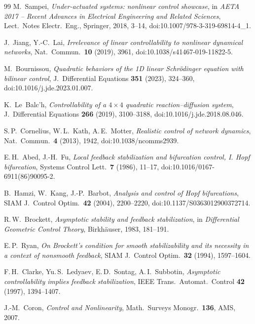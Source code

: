 \documentclass[11pt,reqno]{amsart}
\theoremstyle{plain}
\theoremstyle{definition}
\theoremstyle{remark}
\begin{document}
\begin{thebibliography}{99}
 M.~Sampei,
  \emph{Under-actuated systems: nonlinear control showcase}, in \emph{AETA 2017 -- Recent Advances in Electrical
  Engineering and Related Sciences}, Lect.\ Notes Electr.\ Eng., Springer, 2018, 3--14,
  doi:10.1007/978-3-319-69814-4\_1.

 J.~Jiang, Y.-C.~Lai,
  \emph{Irrelevance of linear controllability to nonlinear dynamical networks}, Nat.\ Commun.\ \textbf{10} (2019),
  3961, doi:10.1038/s41467-019-11822-5.

 M.~Bournissou,
  \emph{Quadratic behaviors of the 1D linear Schr\"odinger equation with bilinear control}, J.\ Differential
  Equations \textbf{351} (2023), 324--360, doi:10.1016/j.jde.2023.01.007.

 K.~Le~Balc'h,
  \emph{Controllability of a $4\times4$ quadratic reaction--diffusion system}, J.\ Differential Equations
  \textbf{266} (2019), 3100--3188, doi:10.1016/j.jde.2018.08.046.

 S.\,P.~Cornelius, W.\,L.~Kath, A.\,E.~Motter,
  \emph{Realistic control of network dynamics}, Nat.\ Commun.\ \textbf{4} (2013), 1942, doi:10.1038/ncomms2939.

 E.\,H.~Abed, J.-H.~Fu,
  \emph{Local feedback stabilization and bifurcation control, I. Hopf
  bifurcation}, Systems Control Lett.\ \textbf{7} (1986), 11--17, doi:10.1016/0167-6911(86)90095-2.

 B.~Hamzi, W.~Kang, J.-P.~Barbot,
  \emph{Analysis and control of Hopf bifurcations}, SIAM J.\ Control Optim.\ \textbf{42} (2004), 2200--2220,
  doi:10.1137/S0363012900372714.

 R.\,W.~Brockett,
  \emph{Asymptotic stability and feedback stabilization}, in
  \emph{Differential Geometric Control Theory}, Birkh\"auser, 1983, 181--191.

 E.\,P.~Ryan,
  \emph{On Brockett's condition for smooth stabilizability and its necessity in a context of
  nonsmooth feedback}, SIAM J.\ Control Optim.\ \textbf{32} (1994), 1597--1604.

 F.\,H.~Clarke, Yu.\,S.~Ledyaev, E.\,D.~Sontag, A.\,I.~Subbotin,
  \emph{Asymptotic controllability implies feedback stabilization},
  IEEE Trans.\ Automat.\ Control \textbf{42} (1997), 1394--1407.

 J.-M.~Coron,
  \emph{Control and Nonlinearity}, Math.\ Surveys Monogr.\ \textbf{136}, AMS, 2007.


\end{thebibliography}
\end{document}

